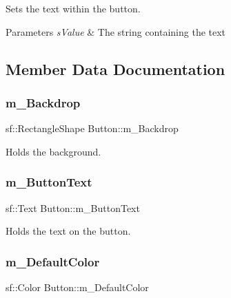 Sets the text within the button. 


\begin{DoxyParams}{Parameters}
{\em s\+Value} & The string containing the text \\
\hline
\end{DoxyParams}


\subsection{Member Data Documentation}
\mbox{\label{class_button_a0fc282280a38c36feb2c3e74a9a5b492}} 
\subsubsection{\texorpdfstring{m\+\_\+\+Backdrop}{m\_Backdrop}}
{\footnotesize\ttfamily sf\+::\+Rectangle\+Shape Button\+::m\+\_\+\+Backdrop\hspace{0.3cm}{\ttfamily [private]}}



Holds the background. 

\mbox{\label{class_button_ae0d027f107671be7d1d46f7963773c69}} 
\subsubsection{\texorpdfstring{m\+\_\+\+Button\+Text}{m\_ButtonText}}
{\footnotesize\ttfamily sf\+::\+Text Button\+::m\+\_\+\+Button\+Text\hspace{0.3cm}{\ttfamily [private]}}



Holds the text on the button. 

\mbox{\label{class_button_af036d6f063c8e9044c8378c9ad51d593}} 
\subsubsection{\texorpdfstring{m\+\_\+\+Default\+Color}{m\_DefaultColor}}
{\footnotesize\ttfamily sf\+::\+Color Button\+::m\+\_\+\+Default\+Color\hspace{0.3cm}{\ttfamily [private]}}




